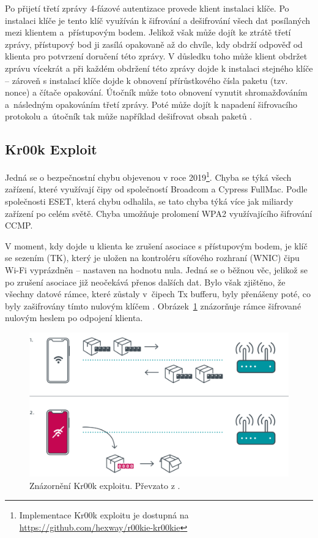 Po přijetí třetí zprávy 4-fázové autentizace provede klient instalaci klíče. Po instalaci klíče je tento klíč využíván k šifrování a dešifrování všech dat posílaných mezi klientem a~přístupovým bodem. Jelikož však může dojít ke ztrátě třetí zprávy, přístupový bod ji zasílá opakovaně až do chvíle, kdy obdrží odpověď od klienta pro potvrzení doručení této zprávy. V důsledku toho může klient obdržet zprávu vícekrát a při každém obdržení této zprávy dojde k instalaci stejného klíče -- zároveň s instalací klíče dojde k obnovení přírůstkového čísla paketu (tzv. nonce) a čítače opakování. Útočník může toto obnovení vynutit shromažďováním a~následným opakováním třetí zprávy. Poté může dojít k napadení šifrovacího protokolu a~útočník tak může například dešifrovat obsah paketů \cite{vanhoef-ccs2017}. 

\subsection{Kr00k Exploit}
Jedná se o bezpečnostní chybu objevenou v roce 2019\footnote{Implementace Kr00k exploitu je dostupná na \url{https://github.com/hexway/r00kie-kr00kie}}. Chyba se týká všech zařízení, které využívají čipy od společností Broadcom a Cypress FullMac. Podle společnosti ESET, která chybu odhalila, se tato chyba týká více jak miliardy zařízení po celém světě. Chyba umožňuje prolomení WPA2 využívajícího šifrování CCMP.

V moment, kdy dojde u klienta ke zrušení asociace s přístupovým bodem, je klíč se sezením (TK), který je uložen na kontroléru síťového rozhraní (WNIC) čipu Wi-Fi vyprázdněn -- nastaven na hodnotu nula. Jedná se o běžnou věc, jelikož se po zrušení asociace již neočekává přenos dalších dat. Bylo však zjištěno, že všechny datové rámce, které zůstaly v~čipech Tx bufferu, byly přenášeny poté, co byly zašifrovány tímto nulovým klíčem \cite{CVE-2019-15126}. Obrázek~\ref{img:kr00k} znázorňuje rámce šifrované nulovým heslem po odpojení klienta.

\begin{figure}[htbp]
  \centering
  \includegraphics[width=14.7cm]{obrazky-figures/kr00k.png}
  \caption{Znázornění Kr00k exploitu. Převzato z \cite{CVE-2019-15126}.}
  \label{img:kr00k}
\end{figure}

